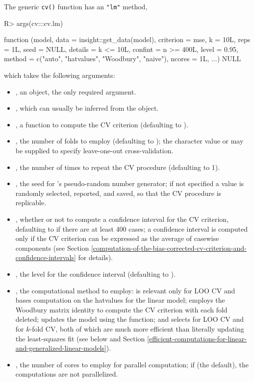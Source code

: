 \documentclass[
]{jss}
\begin{document}
The generic \texttt{cv()} function has an \texttt{"lm"} method,

\begin{CodeChunk}
\begin{CodeInput}
R> args(cv:::cv.lm)
\end{CodeInput}
\begin{CodeOutput}
function (model, data = insight::get_data(model), criterion = mse, 
    k = 10L, reps = 1L, seed = NULL, details = k <= 10L, confint = n >= 
        400L, level = 0.95, method = c("auto", "hatvalues", "Woodbury", 
        "naive"), ncores = 1L, ...) 
NULL
\end{CodeOutput}
\end{CodeChunk}

which takes the following arguments:

\begin{itemize}
\item
  , an  object, the only required argument.
\item
  , which can usually be inferred from the 
  object.
\item
  , a function to compute the CV criterion (defaulting
  to ).
\item
  , the number of folds to employ (defaulting to ); the
  character value  or  may be supplied to specify
  leave-one-out cross-validation.
\item
  , the number of times to repeat the CV procedure
  (defaulting to 1).
\item
  , the seed for 's pseudo-random number
  generator; if not specified a value is randomly selected, reported,
  and saved, so that the CV procedure is replicable.
\item
  , whether or not to compute a confidence interval for
  the CV criterion, defaulting to  if there are at least 400
  cases; a confidence interval is computed only if the CV criterion can
  be expressed as the average of casewise components (see Section
  \ref{computation-of-the-bias-corrected-cv-criterion-and-confidence-intervals}
  for details).
\item
  , the level for the confidence interval (defaulting to
  ).
\item
  , the computational method to employ: 
  is relevant only for LOO CV and bases computation on the hatvalues for
  the linear model;  employs the Woodbury matrix
  identity to compute the CV criterion with each fold deleted;
   updates the model using the  function;
  and  selects  for LOO CV and
   for \(k\)-fold CV, both of which are much more
  efficient than literally updating the least-squares fit (see below and
  Section
  \ref{efficient-computations-for-linear-and-generalized-linear-models}).
\item
  , the number of cores to employ for parallel computation;
  if  (the default), the computations are not
  parallelized.
\end{itemize}
\end{document}
